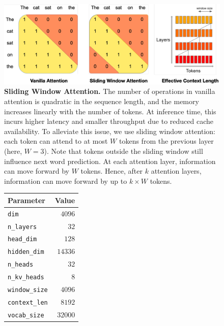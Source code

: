 \documentclass{article}
\begin{document}
\begin{figure}[h]
\centering
\includegraphics[width=0.99\linewidth,height=\textheight,keepaspectratio]{images/swa.pdf}
\caption{\small \textbf{Sliding Window Attention.} The number of operations in vanilla attention is quadratic in the sequence length, and the memory increases linearly with the number of tokens. At inference time, this incurs higher latency and smaller throughput due to reduced cache availability. To alleviate this issue, we use sliding window attention: each token can attend to at most $W$ tokens from the previous layer (here, $W=3$). Note that tokens outside the sliding window still influence next word prediction. At each attention layer, information can move forward by $W$ tokens. Hence, after $k$ attention layers, information can move forward by up to $k \times W$ tokens.}
\label{fig:swa}
\end{figure}

\begin{figure}
\center
\small
\vspace{-15pt}
\begin{tabular}{lr}
\toprule
\textbf{Parameter}  & \textbf{Value} \\ \midrule
\texttt{dim}             & $4096$           \\
\texttt{n\_layers}       & $32$             \\
\texttt{head\_dim}       & $128$            \\
\texttt{hidden\_dim}     & $14336$          \\
\texttt{n\_heads}        & $32$             \\
\texttt{n\_kv\_heads}    & $8$              \\
\texttt{window\_size}    & $4096$           \\
\texttt{context\_len}    & $8192$           \\
\texttt{vocab\_size}     & $32000$          \\ \bottomrule
\end{tabular}
\label{tab:param}
\vspace{-8pt}
\end{figure}
\end{document}
